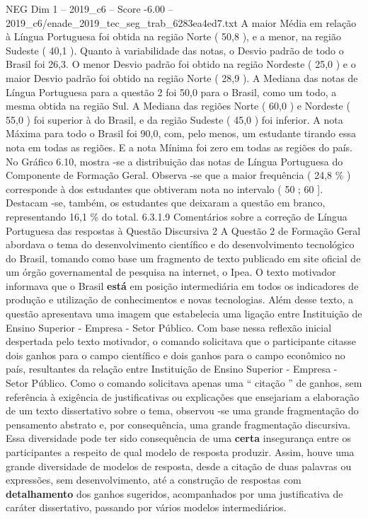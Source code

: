 \begin{textsample}{NEG Dim 1 – 2019\_c6 – Score -6.00 – 2019\_c6/enade\_2019\_tec\_seg\_trab\_6283ea4ed7.txt}
A maior Média em relação à Língua Portuguesa foi obtida na região Norte ( 50,8 ), e a menor, na região Sudeste ( 40,1 ).
Quanto à variabilidade das notas, o Desvio padrão de todo o Brasil foi 26,3.
O menor Desvio padrão foi obtido na região Nordeste ( 25,0 ) e o maior Desvio padrão foi obtido na região Norte ( 28,9 ).
A Mediana das notas de Língua Portuguesa para a questão 2 foi 50,0 para o Brasil, como um todo, a mesma obtida na região Sul.
A Mediana das regiões Norte ( 60,0 ) e Nordeste ( 55,0 ) foi superior à do Brasil, e da região Sudeste ( 45,0 ) foi inferior.
A nota Máxima para todo o Brasil foi 90,0, com, pelo menos, um estudante tirando essa nota em todas as regiões.
E a nota Mínima foi zero em todas as regiões do país.
No Gráfico 6.10, mostra -se a distribuição das notas de Língua Portuguesa do Componente de Formação Geral.
Observa -se que a maior frequência ( 24,8 \% ) corresponde à dos estudantes que obtiveram nota no intervalo ( 50 ; 60 ].
Destacam -se, também, os estudantes que deixaram a questão em branco, representando 16,1 \% do total. 6.3.1.9 Comentários sobre a correção de Língua Portuguesa das respostas à Questão Discursiva 2 A Questão 2 de Formação Geral abordava o tema do desenvolvimento científico e do desenvolvimento tecnológico do Brasil, tomando como base um fragmento de texto publicado em site oficial de um órgão governamental de pesquisa na internet, o Ipea.
O texto motivador informava que o Brasil \textbf{está} em posição intermediária em todos os indicadores de produção e utilização de conhecimentos e novas tecnologias.
Além desse texto, a questão apresentava uma imagem que estabelecia uma ligação entre Instituição de Ensino Superior - Empresa - Setor Público.
Com base nessa reflexão inicial despertada pelo texto motivador, o comando solicitava que o participante citasse dois ganhos para o campo científico e dois ganhos para o campo econômico no país, resultantes da relação entre Instituição de Ensino Superior - Empresa - Setor Público.
Como o comando solicitava apenas uma “ citação ” de ganhos, sem referência à exigência de justificativas ou explicações que ensejariam a elaboração de um texto dissertativo sobre o tema, observou -se uma grande fragmentação do pensamento abstrato e, por consequência, uma grande fragmentação discursiva.
Essa diversidade pode ter sido consequência de uma \textbf{certa} insegurança entre os participantes a respeito de qual modelo de resposta produzir.
Assim, houve uma grande diversidade de modelos de resposta, desde a citação de duas palavras ou expressões, sem desenvolvimento, até a construção de respostas com \textbf{detalhamento} dos ganhos sugeridos, acompanhados por uma justificativa de caráter dissertativo, passando por vários modelos intermediários.

\end{textsample}
